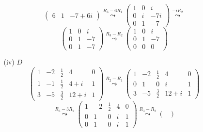\documentclass[a4paper]{article}
\theoremstyle{break}
\theoremstyle{break}
\theoremstyle{break}
\theoremstyle{break}
\begin{document}
\begin{enumerate}
\begin{enumerate}
\[\begin{pmatrix}
				            6 & 1 & -7 + 6i
			            \end{pmatrix}
			            \stackrel{R_3 - 6R_1}{\leadsto}
			            \begin{pmatrix}
				            1 & 0 & i   \\
				            0 & i & -7i \\
				            0 & 1 & -7
			            \end{pmatrix}
			            \stackrel{-iR_2}{\leadsto}
		            \]
		            \[
			            \begin{pmatrix}
				            1 & 0 & i  \\
				            0 & 1 & -7 \\
				            0 & 1 & -7
			            \end{pmatrix}
			            \stackrel{R_3 - R_2}{\leadsto}
			            \begin{pmatrix}
				            1 & 0 & i  \\
				            0 & 1 & -7 \\
				            0 & 0 & 0
			            \end{pmatrix}
		            \]
		      \item[(iv)] \( D \)
		            \[
			            \begin{pmatrix}
				            1 & -2 & \frac{1}{2} & 4      & 0 \\
				            1 & -1 & \frac{1}{2} & 4+i    & 1 \\
				            3 & -5 & \frac{3}{2} & 12 + i & 1
			            \end{pmatrix}
			            \stackrel{R_2 - R_1}{\leadsto}
			            \begin{pmatrix}
				            1 & -2 & \frac{1}{2} & 4      & 0 \\
				            0 & 1  & 0           & i      & 1 \\
				            3 & -5 & \frac{3}{2} & 12 + i & 1
			            \end{pmatrix}
		            \]
		            \[
			            \stackrel{R_3 - 3R_1}{\leadsto}
			            \begin{pmatrix}
				            1 & -2 & \frac{1}{2} & 4 & 0 \\
				            0 & 1  & 0           & i & 1 \\
				            0 & 1  & 0           & i & 1
			            \end{pmatrix}
			            \stackrel{R_3 - R_2}{\leadsto}
			            \begin{pmatrix}

\end{pmatrix}\]
\end{enumerate}
\end{enumerate}
\end{document}
